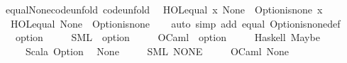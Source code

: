 \begin{isabellebody}
%
\isatagdocument
%
\isamarkuptrue%
%
\endisatagdocument
{\isafolddocument}%
%
\isadelimdocument
%
\endisadelimdocument
{}\isamarkupfalse%
\ equal{\isacharunderscore}{\kern0pt}None{\isacharunderscore}{\kern0pt}code{\isacharunderscore}{\kern0pt}unfold\ {\isacharbrackleft}{\kern0pt}code{\isacharunderscore}{\kern0pt}unfold{\isacharbrackright}{\kern0pt}{\isacharcolon}{\kern0pt}\isanewline
\ \ {\isachardoublequoteopen}HOL{\isachardot}{\kern0pt}equal\ x\ None\ {\isasymlongleftrightarrow}\ Option{\isachardot}{\kern0pt}is{\isacharunderscore}{\kern0pt}none\ x{\isachardoublequoteclose}\isanewline
\ \ {\isachardoublequoteopen}HOL{\isachardot}{\kern0pt}equal\ None\ {\isacharequal}{\kern0pt}\ Option{\isachardot}{\kern0pt}is{\isacharunderscore}{\kern0pt}none{\isachardoublequoteclose}\isanewline
%
\isadelimproof
\ \ %
\endisadelimproof
%
\isatagproof
{}\isamarkupfalse%
\ {\isacharparenleft}{\kern0pt}auto\ simp\ add{\isacharcolon}{\kern0pt}\ equal\ Option{\isachardot}{\kern0pt}is{\isacharunderscore}{\kern0pt}none{\isacharunderscore}{\kern0pt}def{\isacharparenright}{\kern0pt}%
\endisatagproof
{\isafoldproof}%
%
\isadelimproof
\isanewline
%
\endisadelimproof
\isanewline
{}\isamarkupfalse%
\isanewline
\ \ \ option\ {\isasymrightharpoonup}\isanewline
\ \ \ \ {\isacharparenleft}{\kern0pt}SML{\isacharparenright}{\kern0pt}\ {\isachardoublequoteopen}{\isacharunderscore}{\kern0pt}\ option{\isachardoublequoteclose}\isanewline
\ \ \ \ \ {\isacharparenleft}{\kern0pt}OCaml{\isacharparenright}{\kern0pt}\ {\isachardoublequoteopen}{\isacharunderscore}{\kern0pt}\ option{\isachardoublequoteclose}\isanewline
\ \ \ \ \ {\isacharparenleft}{\kern0pt}Haskell{\isacharparenright}{\kern0pt}\ {\isachardoublequoteopen}Maybe\ {\isacharunderscore}{\kern0pt}{\isachardoublequoteclose}\isanewline
\ \ \ \ \ {\isacharparenleft}{\kern0pt}Scala{\isacharparenright}{\kern0pt}\ {\isachardoublequoteopen}{\isacharbang}{\kern0pt}Option{\isacharbrackleft}{\kern0pt}{\isacharparenleft}{\kern0pt}{\isacharunderscore}{\kern0pt}{\isacharparenright}{\kern0pt}{\isacharbrackright}{\kern0pt}{\isachardoublequoteclose}\isanewline
{\isacharbar}{\kern0pt}\ \ None\ {\isasymrightharpoonup}\isanewline
\ \ \ \ {\isacharparenleft}{\kern0pt}SML{\isacharparenright}{\kern0pt}\ {\isachardoublequoteopen}NONE{\isachardoublequoteclose}\isanewline
\ \ \ \ \ {\isacharparenleft}{\kern0pt}OCaml{\isacharparenright}{\kern0pt}\ {\isachardoublequoteopen}None{\isachardoublequoteclose}\isanewline

\end{isabellebody}
